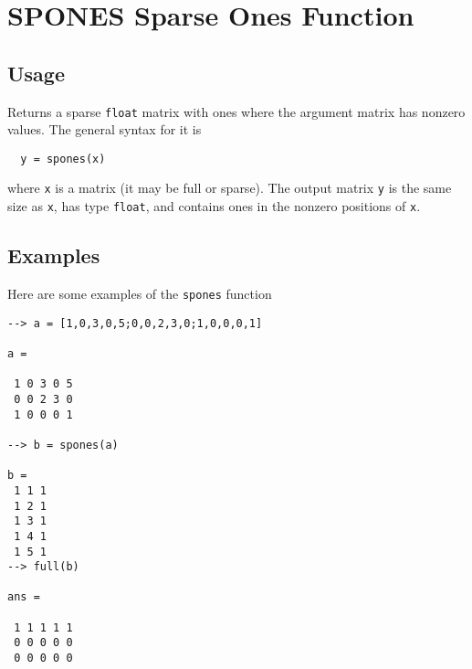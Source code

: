 \section{SPONES Sparse Ones Function}

\subsection{Usage}

Returns a sparse \verb|float| matrix with ones where the argument
matrix has nonzero values.  The general syntax for it is
\begin{verbatim}
  y = spones(x)
\end{verbatim}
where \verb|x| is a matrix (it may be full or sparse).  The output
matrix \verb|y| is the same size as \verb|x|, has type \verb|float|, and contains
ones in the nonzero positions of \verb|x|.
\subsection{Examples}

Here are some examples of the \verb|spones| function
\begin{verbatim}
--> a = [1,0,3,0,5;0,0,2,3,0;1,0,0,0,1]

a = 

 1 0 3 0 5 
 0 0 2 3 0 
 1 0 0 0 1 

--> b = spones(a)

b = 
 1 1 1
 1 2 1
 1 3 1
 1 4 1
 1 5 1
--> full(b)

ans = 

 1 1 1 1 1 
 0 0 0 0 0 
 0 0 0 0 0 
\end{verbatim}
